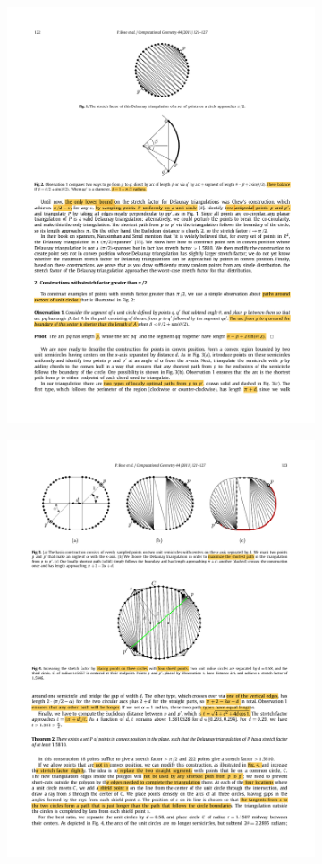 \begin{figure}[ht]
        \centering
        \begin{subfigure}[b]{0.475\textwidth}
            \centering
            \includegraphics[width=.8\textwidth]{Figures/Bose_a.pdf}
            \caption[]%
            {{}}    
            \label{fig:Bose_a}
        \end{subfigure}
        \hfill
        \begin{subfigure}[b]{0.475\textwidth}  
            \centering 
            \includegraphics[width=.8\textwidth]{Figures/Bose_b.pdf}

\end{subfigure}
\end{figure}

